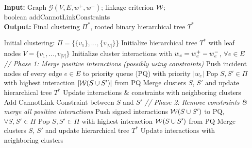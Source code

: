 \begin{algorithm}[t]
\footnotesize
  \begin{flushleft}
  \footnotesize
  \caption{\algname{}}
   \hspace*{\algorithmicindent} \textbf{Input:} Graph $\mathcal{G}(V,E,w^+,w^-)$; linkage criterion $\mathcal{W}{}$; \\ 
   \hspace*{4.3em}boolean {\color{blue}addCannotLinkConstraints}  \\
  \hspace*{\algorithmicindent} \textbf{Output:} Final clustering $\Pi^*$, rooted binary hierarchical tree $T^*$\\
  \hspace*{\algorithmicindent} 
  \begin{algorithmic}[1]
  \footnotesize
      \State Initial clustering: $\Pi=\{\{v_1\}, \ldots, \{v_{|V|}\}\}$
      \State Initialize hierarchical tree $T^*$ with leaf nodes  $V=\{v_1,\ldots,v_{|V|}\}$
      \State Initialize  cluster interactions with $w_e = w^+_e - w^-_e$, $\forall e\in E$
      \State \emph{// Phase 1: Merge positive interactions (possibly using constraints)}
      \State Push incident nodes of every edge $e\in E$ to priority queue (PQ) with priority $|w_e|$
      \Repeat 
        \State Pop $S,S'\in\Pi$ with highest interaction $|\mathcal{W}{}(S  \cup  S')|$ from PQ
          \State Merge clusters $S$, $S'$ and update hierarchical tree $T^*$
          \State Update interactions \& constraints with neighboring clusters
          \State Add CannotLink Constraint between $S$ and $S'$
        \EndIf
      \State \emph{// Phase 2: Remove constraints \& merge all positive interactions}
      \State Push signed interactions $\mathcal{W}{}(S \cup S')$ to PQ, $\forall S, S' \in \Pi$
      \Repeat 
        \State Pop $S,S'\in\Pi$ with highest interaction $\mathcal{W}{}(S \cup S')$ from PQ
          \State Merge clusters $S$, $S'$ and update hierarchical tree $T^*$
          \State Update interactions with neighboring clusters

\end{algorithmic}
\end{flushleft}
\end{algorithm}
